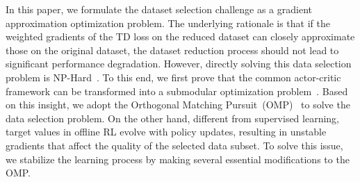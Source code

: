 


In this paper, we formulate the dataset selection challenge as a gradient approximation optimization problem. 
The underlying rationale is that if the weighted gradients of the TD loss on the reduced dataset can closely approximate those on the original dataset, the dataset reduction process should not lead to significant performance degradation.
However, directly solving this data selection problem is NP-Hard~\citep{killamsetty2021glister,killamsetty2021retrieve}.
To this end, we first prove that the common actor-critic framework can be transformed into a submodular optimization problem~\citep{mirzasoleiman2020coresets}.
Based on this insight, we adopt the Orthogonal Matching Pursuit~(OMP)~\citep{elenberg2018restricted} to solve the data selection problem.
On the other hand, different from supervised learning, target values in offline RL evolve with policy updates, resulting in unstable gradients that affect the quality of the selected data subset.
To solve this issue, we stabilize the learning process by making several essential modifications to the OMP.


